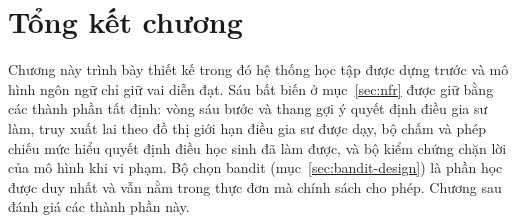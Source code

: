 \section{Tổng kết chương}
Chương này trình bày thiết kế trong đó hệ thống học tập được dựng trước và mô hình ngôn ngữ chỉ giữ vai diễn đạt. Sáu bất biến ở mục~\ref{sec:nfr} được giữ bằng các thành phần tất định: vòng sáu bước và thang gợi ý quyết định điều gia sư làm, truy xuất lai theo đồ thị giới hạn điều gia sư được dạy, bộ chấm và phép chiếu mức hiểu quyết định điều học sinh đã làm được, và bộ kiểm chứng chặn lời của mô hình khi vi phạm. Bộ chọn bandit (mục~\ref{sec:bandit-design}) là phần học được duy nhất và vẫn nằm trong thực đơn mà chính sách cho phép. Chương sau đánh giá các thành phần này.
